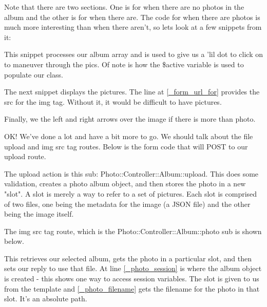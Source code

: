 \documentclass[14pt]{extreport}
\begin{document}
Note that there are two sections.  One is for when there are no photos in the
album and the other is for when there are.  The code for when there are photos
is much more interesting than when there aren't, so lets look at a few snippets
from it:

This snippet processes our album array and is used to give us a 'lil dot to
click on to maneuver through the pics.  Of note is how the \$active variable is
used to populate our class.



The next snippet displays the pictures. The line at \ref{_form_url_for} provides the 
src for the img tag. Without it, it would be difficult to have pictures.



Finally, we the left and right arrows over the image if there is more than photo.



OK!  We've done a lot and have a bit more to go.  We should talk about the file upload
and img src tag routes.  Below is the form code that will POST to our upload route.



The upload action is this sub: Photo::Controller::Album::upload.  This does
some validation, creates a photo album object, and then stores the photo in a
new "slot".  A slot is merely a way to refer to a set of pictures.  Each slot
is comprised of two files, one being the metadata for the image (a JSON file)
and the other being the image itself.

The img src tag route, which is the Photo::Controller::Album::photo sub is shown below.



This retrieves our selected album, gets the photo in a particular slot, and
then sets our reply to use that file. At line \ref{_photo_session} is where the
album object is created - this shows one way to access session variables. The slot
is given to us from the template and \ref{_photo_filename} gets the filename
for the photo in that slot.  It's an absolute path.
\end{document}
